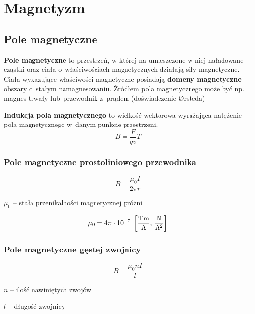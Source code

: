 \chapter{Magnetyzm}
  \section{Pole magnetyczne}
    \begin{definition}
      \textbf{Pole magnetyczne} to przestrzeń, w której na umieszczone w niej naładowane cząstki oraz ciała o~właściwościach magnetycznych działają siły magnetyczne. Ciała wykazujące właściwości magnetyczne posiadają \textbf{domeny magnetyczne} --- obszary o~stałym namagnesowaniu. Źródłem pola magnetycznego może być np. magnes trwały lub~przewodnik z~prądem (doświadczenie Ørsteda)
      \begin{center}
        \begin{tikzpicture}
        \end{tikzpicture}
      \end{center}
    \end{definition}

    \begin{definition}
      \textbf{Indukcja pola magnetycznego} to wielkość wektorowa wyrażająca natężenie pola magnetycznego w~danym punkcie przestrzeni.
      \begin{equation}
        B = \frac{F}{qv} \unit{T}
      \end{equation}
    \end{definition}

    \subsection{Pole magnetyczne prostoliniowego przewodnika}
      \begin{equation*}
        B = \frac{\mu_0 I}{2\pi r}
      \end{equation*}
      \begin{symbols}
        \item $\mu_0$ -- stała przenikalności magnetycznej próżni
      \end{symbols}
      \begin{equation*}
        \mu_0 = 4\pi\cdot 10^{-7} \units{\frac{Tm}{A}}{\frac{N}{A^2}}
      \end{equation*}

    \subsection{Pole magnetyczne gęstej zwojnicy}
      \begin{equation*}
        B = \frac{\mu_0 nI}{l}
      \end{equation*}
      \begin{symbols}
        \item $n$ -- ilość nawiniętych zwojów
        \item $l$ -- długość zwojnicy
      \end{symbols}

